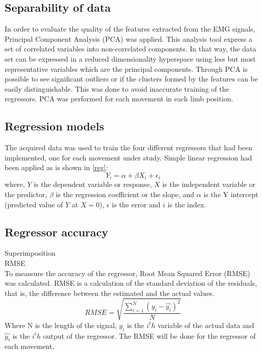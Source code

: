 \documentclass[a4paper, 10pt, conference]{ieeeconf}      %
\begin{document}
	\subsection{Separability of data}
	In order to evaluate the quality of the features extracted from the EMG signals, Principal Component Analysis (PCA) was applied. This analysis tool express a set of correlated variables into non-correlated components. In that way, the data set can be expressed in a reduced dimensionality hyperspace using less but most representative variables which are the principal components. Through PCA is  possible to see significant outliers or if the clusters formed by the features can be easily distinguishable. This was done to avoid inaccurate training of the regressors. PCA was performed for each movement in each limb position. %
	\subsection{Regression models}
	The acquired data was used to train the four different regressors that had been implemented, one for each movement under study. Simple linear regression had been applied as is shown in \ref{reg}:
	\begin{equation} \label{eq:simpleLinearRegression}
	Y_i = \alpha + \beta X_i + \epsilon_i
	\label{reg}
	\end{equation}
	where, $Y$ is the dependent variable or response, $X$ is the independent variable or the predictor, $\beta$ is the regression coefficient or the slope, and $\alpha$ is the Y intercept (predicted value of $Y$ at $X = 0$),  $\epsilon$ is the error and $i$ is the index.
	
	
	\subsection{Regressor accuracy}
	Superimposition\\
	RMSE\\
	To meassure the accuracy of the regressor, Root Mean Squared Error (RMSE) was calculated. RMSE is a calculation of the standard deviation of the residuals, that is, the difference between the estimated and the actual values.
	\begin{equation}
	RMSE = \sqrt{\frac{\sum\limits_{i=1}^N(y_i - \hat{y_i})^2}{N}}
	\end{equation}
	Where N is the length of the signal, $y_i$ is the $i^th$ variable of the actual data and $\hat{y_i}$ is the $i^th$ output of the regressor. The RMSE will be done for the regressor of each movement.\\
	
\end{document}
